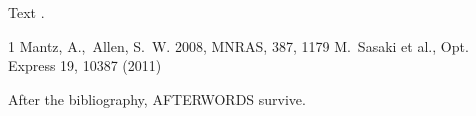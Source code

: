 \documentclass{article}
\providecommand\citenamefont[1]{#1}
\begin{document}
Text \citep{mae08,sas11}.
\begin{thebibliography}{1}
{Mantz}, A., $\, \!${Allen}, S.~W. 2008, MNRAS, 387, 1179
\bibitem[{\citenamefont {Sasaki$}(2011)}]{sas11}
M.~Sasaki et al., Opt. Express 19, 10387 (2011)
\end{thebibliography}
After the bibliography, AFTERWORDS survive.
\end{document}
